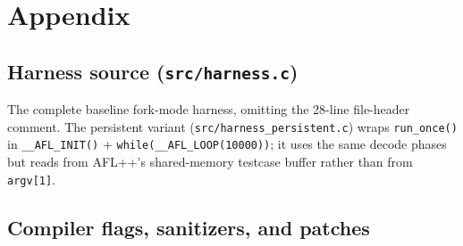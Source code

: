 \documentclass[letterpaper,twocolumn,10pt]{article}
\begin{document}
\clearpage
\onecolumn
\appendix
\section*{Appendix}
\renewcommand{\thesubsection}{A.\arabic{subsection}}

\subsection{Harness source (\texttt{src/harness.c})}
\label{app:harness}
The complete baseline fork-mode harness, omitting the 28-line file-header comment.
The persistent variant (\texttt{src/harness\_persistent.c}) wraps
\texttt{run\_once()} in \texttt{\_\_AFL\_INIT()} +
\texttt{while(\_\_AFL\_LOOP(10000))}; it uses the same decode phases but reads
from AFL++'s shared-memory testcase buffer rather than from \texttt{argv[1]}.



\subsection{Compiler flags, sanitizers, and patches}
\label{app:flags}
\end{document}
